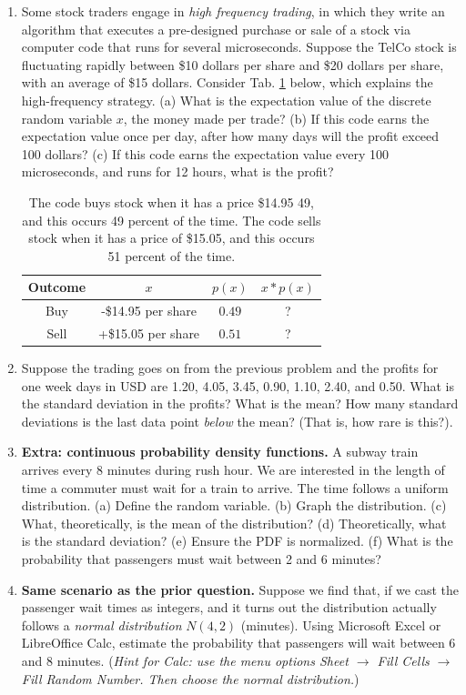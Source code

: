 \documentclass{article}
\begin{document}
\begin{enumerate}
\item Some stock traders engage in \textit{high frequency trading}, in which they write an algorithm that executes a pre-designed purchase or sale of a stock via computer code that runs for several microseconds.  Suppose the TelCo stock is fluctuating rapidly between \$10 dollars per share and \$20 dollars per share, with an average of \$15 dollars. Consider Tab. \ref{tab:stock} below, which explains the high-frequency strategy.  (a) What is the expectation value of the discrete random variable $x$, the money made per trade? (b) If this code earns the expectation value once per day, after how many days will the profit exceed 100 dollars?  (c) If this code earns the expectation value every 100 microseconds, and runs for 12 hours, what is the profit?
\begin{table}[ht]
\centering
\begin{tabular}{| c | c | c | c |}
\hline
\textbf{Outcome} & $x$ & $p(x)$ & $x*p(x)$ \\ \hline \hline
Buy & -\$14.95 per share & $0.49$ & ? \\ \hline
Sell & +\$15.05 per share & $0.51$ & ? \\ \hline
\hline
\end{tabular}
\caption{\label{tab:stock} The code buys stock when it has a price \$14.95 49, and this occurs 49 percent of the time.  The code sells stock when it has a price of \$15.05, and this occurs 51 percent of the time.} \vspace{2cm}
\end{table}
\item Suppose the trading goes on from the previous problem and the profits for one week days in USD are 1.20, 4.05, 3.45, 0.90, 1.10, 2.40, and 0.50.  What is the standard deviation in the profits?  What is the mean?  How many standard deviations is the last data point \textit{below} the mean?  (That is, how rare is this?). \\ \vspace{2cm}
\item \textbf{Extra: continuous probability density functions.}  A subway train arrives every 8 minutes during rush hour. We are interested in the length of time a commuter must wait for a train to arrive. The time follows a uniform distribution. (a) Define the random variable. (b) Graph the distribution. (c) What, theoretically, is the mean of the distribution? (d) Theoretically, what is the standard deviation? (e) Ensure the PDF is normalized.  (f) What is the probability that passengers must wait between 2 and 6 minutes? \\ \vspace{3cm}
\item \textbf{Same scenario as the prior question.} Suppose we find that, if we cast the passenger wait times as integers, and it turns out the distribution actually follows a \textit{normal distribution} $N(4,2)$ (minutes). Using Microsoft Excel or LibreOffice Calc, estimate the probability that passengers will wait between 6 and 8 minutes. (\textit{Hint for Calc: use the menu options Sheet $\rightarrow$ Fill Cells $\rightarrow$ Fill Random Number.  Then choose the normal distribution.})
\end{enumerate}
\end{document}
